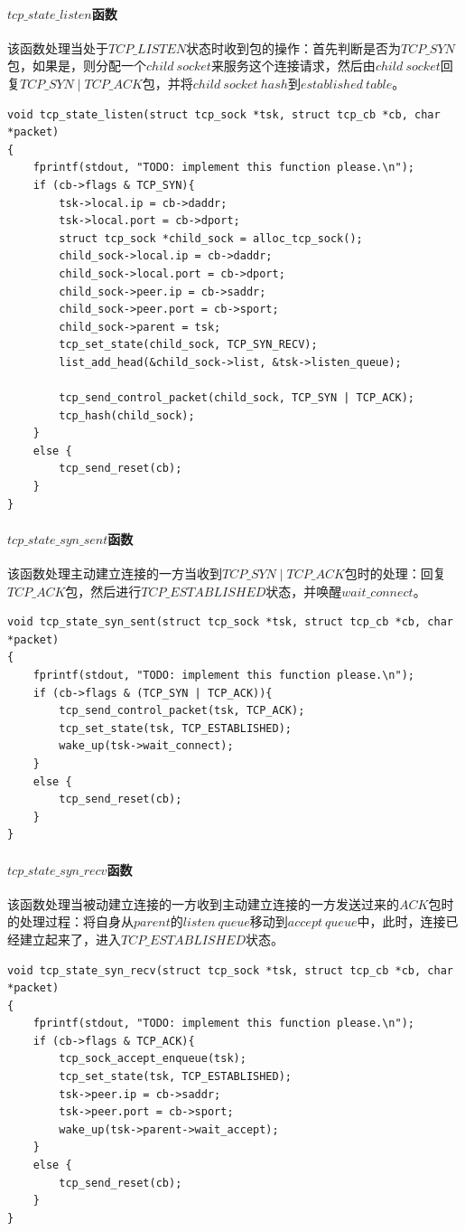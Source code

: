 \documentclass[UTF8,noindent]{ctexart}
\begin{document}
\paragraph{$tcp\_state\_listen$函数}
该函数处理当处于$TCP\_LISTEN$状态时收到包的操作：首先判断是否为$TCP\_SYN$包，如果是，则分配一个$child\ socket$来服务这个连接请求，然后由$child\ socket$回复$TCP\_SYN\mid TCP\_ACK$包，并将$child\ socket\ hash$到$established\ table$。
\begin{lstlisting}
void tcp_state_listen(struct tcp_sock *tsk, struct tcp_cb *cb, char *packet)
{
	fprintf(stdout, "TODO: implement this function please.\n");
	if (cb->flags & TCP_SYN){
		tsk->local.ip = cb->daddr;
		tsk->local.port = cb->dport;
		struct tcp_sock *child_sock = alloc_tcp_sock();
		child_sock->local.ip = cb->daddr;
		child_sock->local.port = cb->dport;
		child_sock->peer.ip = cb->saddr;
		child_sock->peer.port = cb->sport;
		child_sock->parent = tsk;
		tcp_set_state(child_sock, TCP_SYN_RECV);
		list_add_head(&child_sock->list, &tsk->listen_queue);

		tcp_send_control_packet(child_sock, TCP_SYN | TCP_ACK);
		tcp_hash(child_sock);
	}
	else {
		tcp_send_reset(cb);
	}
}
\end{lstlisting}

\paragraph{$tcp\_state\_syn\_sent$函数}
该函数处理主动建立连接的一方当收到$TCP\_SYN\mid TCP\_ACK$包时的处理：回复$TCP\_ACK$包，然后进行$TCP\_ESTABLISHED$状态，并唤醒$wait\_connect$。
\begin{lstlisting}
void tcp_state_syn_sent(struct tcp_sock *tsk, struct tcp_cb *cb, char *packet)
{
	fprintf(stdout, "TODO: implement this function please.\n");
	if (cb->flags & (TCP_SYN | TCP_ACK)){
		tcp_send_control_packet(tsk, TCP_ACK);
		tcp_set_state(tsk, TCP_ESTABLISHED);
		wake_up(tsk->wait_connect);
	}
	else {
		tcp_send_reset(cb);
	}
}
\end{lstlisting}

\paragraph{$tcp\_state\_syn\_recv$函数}
该函数处理当被动建立连接的一方收到主动建立连接的一方发送过来的$ACK$包时的处理过程：将自身从$parent$的$listen\ queue$移动到$accept\ queue$中，此时，连接已经建立起来了，进入$TCP\_ESTABLISHED$状态。
\begin{lstlisting}
void tcp_state_syn_recv(struct tcp_sock *tsk, struct tcp_cb *cb, char *packet)
{
	fprintf(stdout, "TODO: implement this function please.\n");
	if (cb->flags & TCP_ACK){
		tcp_sock_accept_enqueue(tsk);
		tcp_set_state(tsk, TCP_ESTABLISHED);
		tsk->peer.ip = cb->saddr;
		tsk->peer.port = cb->sport;
		wake_up(tsk->parent->wait_accept);
	}
	else {
		tcp_send_reset(cb);
	}
}
\end{lstlisting}
\end{document}
